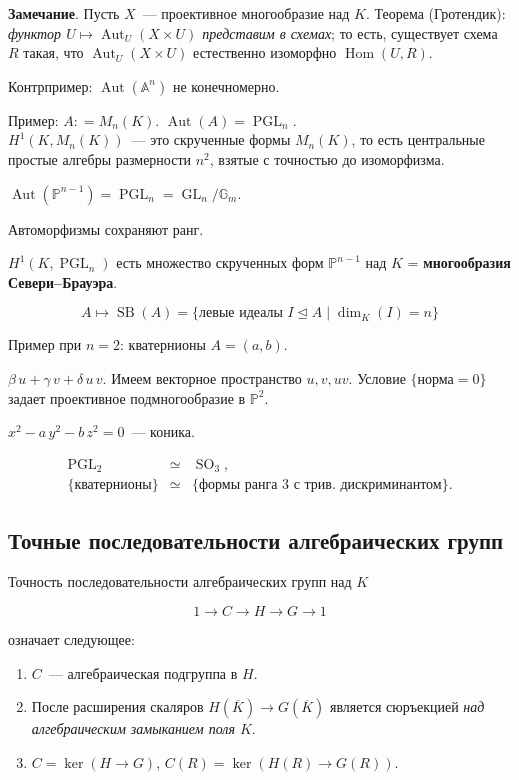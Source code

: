 \documentclass[a4paper]{article}
\DeclareMathOperator{\Aut}{Aut}
\DeclareMathOperator{\Hom}{Hom}
\DeclareMathOperator{\PGL}{PGL}
\DeclareMathOperator{\GL}{GL}
\DeclareMathOperator{\SB}{SB}
\DeclareMathOperator{\SO}{SO}
\newcommand{\term}{\textbf}
\newcommand{\dfn}{\mathrel{\mathop:}=}
\newcommand{\isom}{\simeq}
\theoremstyle{definition}
\newcommand{\trleq}{\trianglelefteq}
\begin{document}
\vspace{2em}

\noindent\textbf{Замечание}. Пусть $X$~--- проективное многообразие
над $K$. Теорема (Гротендик): \emph{функтор $U \mapsto \Aut_U (X\times
  U)$ представим в схемах}; то есть, существует схема $R$ такая, что
$\Aut_U(X\times U)$ естественно изоморфно $\Hom(U,R)$.

\vspace{2em}

Контрпример: $\Aut (\mathbb{A}^n)$ не конечномерно.

Пример: $A \dfn M_n (K)$. $\Aut (A) = \PGL_n$.\\
$H^1 (K, M_n(K))$~--- это скрученные формы $M_n (K)$, то есть
центральные простые алгебры размерности $n^2$, взятые с точностью до
изоморфизма.

$\Aut (\mathbb{P}^{n-1}) = \PGL_n = \GL_n / \mathbb{G}_m$.

Автоморфизмы сохраняют ранг.

$H^1 (K, \PGL_n)$ есть множество скрученных форм $\mathbb{P}^{n-1}$
над $K$ = \term{многообразия Севери--Брауэра}.

\[ A \mapsto \SB (A) = \{ \text{левые идеалы $I\trleq A$}\mid
\dim_K(I)=n \} \]

Пример при $n=2$: кватернионы $A = (a,b)$.

$\beta\,u + \gamma\,v + \delta\,u\,v$. Имеем векторное пространство
$u,v,uv$. Условие $\{ \text{норма} = 0 \}$ задает проективное
подмногообразие в $\mathbb{P}^2$.

$x^2 - a\,y^2 - b\,z^2 = 0$~--- коника.

\begin{eqnarray*}
\PGL_2 & \isom & \SO_3, \\
\{\text{кватернионы}\} & \isom & \{\text{формы ранга }3\text{ с
  трив. дискриминантом}\}.
\end{eqnarray*}

\subsection{Точные последовательности алгебраических групп}

Точность последовательности алгебраических групп над $K$

\[ 1 \to C \to H \to G \to 1 \]

\noindent означает следующее:

\begin{enumerate}
\item $C$~--- алгебраическая подгруппа в $H$.

\item После расширения скаляров $H (\overline{K})\to G (\overline{K})$
  является сюръекцией
  \emph{над алгебраическим замыканием поля $K$}.

\item $C = \ker (H\to G)$, $C(R) = \ker (H(R) \to G(R))$.
\end{enumerate}
\end{document}
